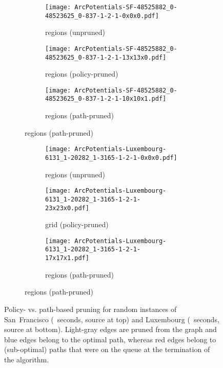 \documentclass[oribibl]{llncs}
\begin{document}
			\begin{figure}[H]
				\centering
				\begin{subfigure}{\textwidth}
					\centering
					\begin{subfigure}{0.32\textwidth}
						\centering
						\texttt{[image: ArcPotentials-SF-48525882\_0-48523625\_0-837-1-2-1-0x0x0.pdf]}
						\caption*{ regions (unpruned)}
					\end{subfigure}
					\begin{subfigure}{0.32\textwidth}
						\centering
						\texttt{[image: ArcPotentials-SF-48525882\_0-48523625\_0-837-1-2-1-13x13x0.pdf]}
						\caption*{ regions (policy-pruned)}
					\end{subfigure}
					\begin{subfigure}{0.32\textwidth}
						\centering
						\texttt{[image: ArcPotentials-SF-48525882\_0-48523625\_0-837-1-2-1-10x10x1.pdf]}
						\caption*{ regions (path-pruned)}
					\end{subfigure}
				\end{subfigure}
				\begin{subfigure}{\textwidth}
					\centering
					\begin{subfigure}{0.32\textwidth}
						\centering
						\texttt{[image: ArcPotentials-Luxembourg-6131\_1-20282\_1-3165-1-2-1-0x0x0.pdf]}
						\caption*{ regions (unpruned)}
					\end{subfigure}
					\begin{subfigure}{0.32\textwidth}
						\centering
						\texttt{[image: ArcPotentials-Luxembourg-6131\_1-20282\_1-3165-1-2-1-23x23x0.pdf]}
						\caption*{ grid (policy-pruned)}
					\end{subfigure}
					\begin{subfigure}{0.32\textwidth}
						\centering
						\texttt{[image: ArcPotentials-Luxembourg-6131\_1-20282\_1-3165-1-2-1-17x17x1.pdf]}
						\caption*{ regions (path-pruned)}
					\end{subfigure}
				\end{subfigure}
				\caption
				{
					Policy- vs. path-based pruning for random instances of
					San~Francisco (~seconds, source at top)
					and Luxembourg (~seconds, source at bottom).
					Light-gray edges are pruned from the graph and blue edges belong to the optimal
					path, whereas red edges belong to (sub-optimal) paths that were on the queue
					at the termination of the algorithm.
				}
				\label{fig:Path}
			\end{figure}
\end{document}
